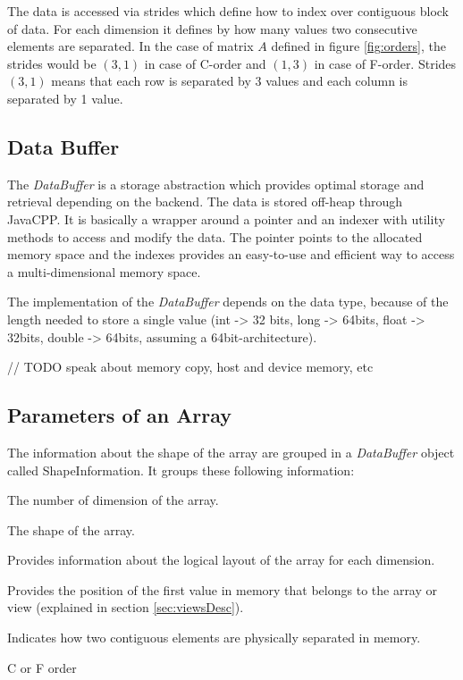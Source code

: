 The data is accessed via strides which define how to index over contiguous block of data. For each dimension it defines by how many values two consecutive elements are separated. In the case of matrix $A$ defined in figure \ref{fig:orders}, the strides would be $(3, 1)$ in case of C-order and $(1, 3)$ in case of F-order. Strides $(3, 1)$ means that each row is separated by 3 values and each column is separated by 1 value.

\subsection{Data Buffer}
The \textit{DataBuffer} is a storage abstraction which provides optimal storage and retrieval depending on the backend. The data is stored off-heap through JavaCPP. It is basically a wrapper around a pointer and an indexer with utility methods to access and modify the data. 
The pointer points to the allocated memory space and the indexes provides an easy-to-use and efficient way to access a multi-dimensional memory space.

The implementation of the \textit{DataBuffer} depends on the data type, because of the length needed to store a single value (int -> 32 bits, long -> 64bits, float -> 32bits, double -> 64bits, assuming a 64bit-architecture).

// TODO speak about memory copy, host and device memory, etc
\subsection{Parameters of an Array}
The information about the shape of the array are grouped in a \textit{DataBuffer} object called ShapeInformation. It groups these following information:

\begin{description}[leftmargin=!,labelwidth=\widthof{\bfseries ElementWiseStride}]
	\item [Rank] The number of dimension of the array.
	\item [Shape] The shape of the array.
	\item [Strides] Provides information about the logical layout of the array for each dimension.
	\item [Offset] Provides the position of the first value in memory that belongs to the array or view (explained in section \ref{sec:viewsDesc}).
	\item [ElementWiseStride] Indicates how two contiguous elements are physically separated in memory.
	\item[Order] C or F order
\end{description}


